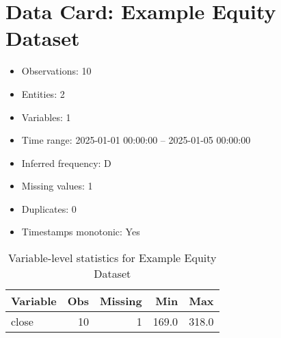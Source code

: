 \section*{Data Card: Example Equity Dataset}
\begin{itemize}
    \item Observations: 10
    \item Entities: 2
    \item Variables: 1
    \item Time range: 2025-01-01 00:00:00 -- 2025-01-05 00:00:00
    \item Inferred frequency: D
    \item Missing values: 1
    \item Duplicates: 0
    \item Timestamps monotonic: Yes
\end{itemize}

\begin{table}[h]
\centering
\begin{tabular}{lrrrr}
\hline
Variable & Obs & Missing & Min & Max \\
\hline
close & 10 & 1 & 169.0 & 318.0 \\
\hline
\end{tabular}
\caption{Variable-level statistics for Example Equity Dataset}
\end{table}
